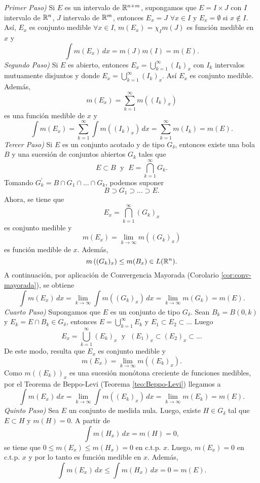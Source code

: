         \begin{demo}
        \emph{Primer Paso)} Si $E$ es un intervalo de $\mathbb{R}^{n+m}$, supongamos que $E=I\times J$ con $I$ intervalo de $\mathbb{R}^n$, $J$ intervalo de $\mathbb{R}^m$, entonces $E_x=J$ $\forall x \in I$ y $E_x=\emptyset$ si $x \notin I$.
        As\'i, $E_x$ es conjunto medible $\forall x \in I$, $m(E_x)=\chi_I m(J)$ es funci\'on medible  en $x$ y 
        \[
        \int m(E_x)\,dx=m(J)m(I)=m(E).
        \]
        \emph{Segundo Paso)} Si $E$ es abierto, entonces $E_x=\bigcup\limits_{k=1}^{\infty} (I_k)_x$ con $I_k$ intervalos mutuamente disjuntos y donde $E_x=\bigcup\limits_{k=1}^{\infty} \left(I_k\right)_x$. 
        As\'i $E_x$ es conjunto medible. Adem\'as, 
        \[
        m(E_x)=\sum\limits_{k=1}^{\infty} m\left((I_k)_x\right)
        \]
        es una funci\'on medible de $x$ y 
        \[
        \int m(E_x)=\sum\limits_{k=1}^{\infty} \int m\left((I_k)_x\right)\,dx=
        \sum\limits_{k=1}^{\infty} m(I_k)=m(E).
        \]
        \emph{Tercer Paso)} Si $E$ es un conjunto acotado y de tipo $G_{\delta}$, entonces existe una bola $B$ y una sucesi\'on de conjuntos abiertos $G_k$ tales que 
        \[
        E\subset B\;\mbox{  y   }\;E=\bigcap\limits_{k=1}^{\infty}G_k.
        \]
        Tomando $G_k^{'}=B\cap G_1\cap \ldots \cap G_k$, podemos suponer
        \[B\supset G_1 \supset \ldots \supset E.\]
        Ahora, se tiene que 
        \[
        E_x=\bigcap\limits_{k=1}^{\infty} \left(G_k\right)_x
        \]
        es conjunto medible y 
        \[
        m(E_x)=\lim\limits_{k \to \infty} m\left((G_k)_x\right)
        \]
        es funci\'on medible de $x$. Adem\'as, 
        \[
        m\left((G_k)_x\right)\leq m(B_x)\in L(\mathbb{R}^n).
        \]
        A continuaci\'on, por aplicaci\'on de Convergencia Mayorada (Corolario \ref{cor:conv-mayorada}), se obtiene 
        \[
        \int m(E_x)\,dx =\lim\limits_{k \to \infty} \int m\left((G_k)_x\right)\,dx =\lim\limits_{k \to \infty} m(G_k)=m(E).
        \]
        \emph{Cuarto Paso)}
        Supongamos que  $E$ es un conjunto de tipo $G_{\delta}$. 
        Sean $B_k=B(0,k)$ y $E_k=E\cap B_k \in G_{\delta}$, entonces $E=\bigcup\limits_{k=1}^{\infty} E_k$ y $E_1\subset E_2\subset \ldots$ Luego
        \[
        E_x=\bigcup\limits_{k=1}^{\infty} \left(E_k\right)_x
        \;\mbox{ y }\;
        (E_1)_x \subset (E_2)_x \subset \ldots
        \]
        De este modo, resulta que $E_x$ es conjunto medible y 
        \[m(E_x) = \lim\limits_{k \to \infty} m((E_k)_x).\]
                Como $m((E_k))_x$ es una sucesi\'on mon\'otona creciente de funciones medibles, por el Teorema de Beppo-Levi (Teorema \ref{teo:Beppo-Levi}) llegamos a 
     \[\int m(E_x)\,dx=\lim\limits_{k \to \infty} \int m\left(\left(E_k\right)_x\right)\,dx=
     \lim\limits_{k \to \infty} m(E_k)=m(E).
                    \]
    \emph{Quinto Paso)} Sea $E$ un conjunto de medida nula. Luego, existe $H\in G_{\delta}$ tal que $E\subset H$ y $m(H)=0$.
    A partir de 
    \[
    \int m(H_x)\,dx=m(H)=0,
    \]
    se tiene que $0\leq m(E_x)\leq m(H_x)=0$ en c.t.p. $x$. Luego, $m(E_x)=0$
    en c.t.p. $x$ y por lo tanto es funci\'on medible en $x$.
    Adem\'as, 
    \[
    \int m(E_x)\,dx \leq \int m(H_x)\,dx=0=m(E).\]


\end{demo}

